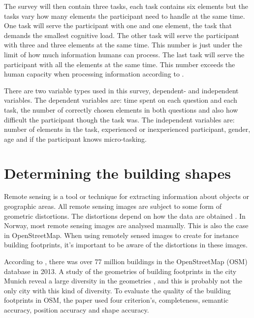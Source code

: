 The survey will then contain three tasks, each task contains six elements but the tasks vary how many elements the participant need to handle at the same time. One task will serve the participant with one and one element, the task that demands the smallest cognitive load. The other task will serve the participant with three and three elements at the same time. This number is just under the limit of how much information humans can process. The last task will serve the participant with all the elements at the same time. This number exceeds the human capacity when processing information according to \cite{Leppink2014a}. 

There are two variable types used in this survey, dependent- and independent variables. The dependent variables are: time spent on each question and each task, the number of correctly chosen elements in both questions and also how difficult the participant though the task was. The independent variables are: number of elements in the task, experienced or inexperienced participant, gender, age and if the participant knows micro-tasking. 

\section[Building shapes]{Determining the building shapes}
Remote sensing is a tool or technique for extracting information about objects or geographic areas. All remote sensing images are subject to some form of geometric distortions. The distortions depend on how the data are obtained \citep{Toutin2004}.  In Norway, most remote sensing images are analysed manually. This is also the case in OpenStreetMap. When using remotely sensed images to create for instance building footprints, it's important to be aware of the distortions in these images. 

According to \cite{Fan2014}, there was over 77 million buildings in the OpenStreetMap (OSM) database in 2013. A study of the geometries of building footprints in the city Munich reveal a large diversity in the geometries \citep{Fan2014}, and this is probably not the only city with this kind of diversity. To evaluate the quality of the building footprints in OSM, the \cite{Fan2014} paper used four criterion's, completeness, semantic accuracy, position accuracy and shape accuracy. 



